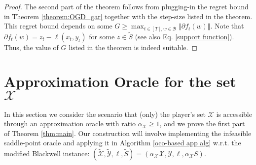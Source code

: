 \documentclass[a4paper,12pt]{article}
\newcommand{\mY}{\mathcal{Y}}
\newcommand{\mX}{\mathcal{X}}
\newcommand{\tY}{\tilde{\mathcal{Y}}}
\newcommand{\tX}{\tilde{\mathcal{X}}}
\newcommand{\tS}{\tilde{S}}
\newcommand{\mA}{\mathcal{A}}
\newcommand{\mB}{\mathcal{B}}
\begin{document}
\begin{proof}
The second part of the theorem follows from plugging-in the regret bound in Theorem \ref{theorem:OGD_gar} together with the step-size listed in the theorem. This regret bound depends on some $G \geq \max_{t\in[T], w\in\mB}\Vert{\partial{}f_t(w)}\Vert$. Note that  $\partial{}f_t(w) = z_t - \ell(x_t,y_t)$ for some $z\in\tilde{S}$ (see also Eq. \eqref{support function}). Thus, the value of $G$ listed in the theorem is indeed suitable.
\end{proof}


\section{Approximation Oracle for the set $\mX$}\label{sec:x}
In this section we consider the scenario that (only) the player's set $\mX$ is accessible through an approximation oracle with ratio $\alpha_{\mX} \geq 1$, and we prove the first part of Theorem \ref{thm:main}.
Our construction will involve implementing the infeasible saddle-point oracle and applying it in Algorithm \ref{oco-based app  alg} w.r.t. the modified Blackwell instance: $(\tX,\tY,\ell,\tS) = (\alpha_{\mX}\mX, \mY, \ell, \alpha_{\mX}S)$.
\end{document}
